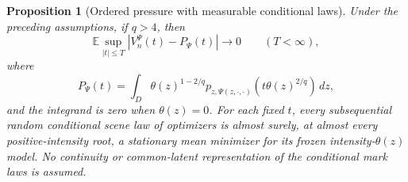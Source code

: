 \documentclass[11pt,reqno]{amsart}
\newtheorem{proposition}[theorem]{Proposition}
\theoremstyle{definition}
\theoremstyle{remark}
\numberwithin{equation}{section}
\newcommand{\E}{\mathbb E}
\begin{document}
\begin{proposition}[Ordered pressure with measurable conditional laws]
\label{prop:highd-measurable-pressure}
Under the preceding assumptions, if \(q>4\), then
\[
 \E\sup_{|t|\le T}|V_n^\Psi(t)-P_\Psi(t)|\longrightarrow0
 \qquad(T<\infty),
\]
where
\begin{equation}
\label{eq:highd-measurable-pressure}
 P_\Psi(t)=\int_D\theta(z)^{1-2/q}
       p_{z,\Psi(z,\cdot,\cdot)}(t\theta(z)^{2/q})\,dz,
\end{equation}
and the integrand is zero when \(\theta(z)=0\).
For each fixed \(t\), every subsequential random conditional scene
law of optimizers is almost surely, at almost every positive-intensity
root, a stationary mean minimizer for its frozen intensity-\(\theta(z)\)
model. No continuity or common-latent representation of the conditional
mark laws is assumed.
\end{proposition}
\end{document}
